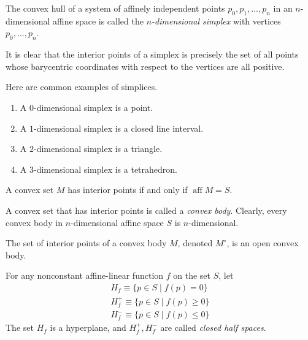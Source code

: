\documentclass{article}
\DeclareMathOperator{\aff}{aff}
\begin{document}
    \begin{definition}
      The convex hull of a system of affinely independent points $p_0, p_1, ..., p_n$ in an $n$-dimensional affine space is called the \textit{$n$-dimensional simplex} with vertices $p_0, ..., p_n$. 
    \end{definition}

    It is clear that the interior points of a simplex is precisely the set of all points whose barycentric coordinates with respect to the vertices are all positive. 

    \begin{example}
      Here are common examples of simplices.
      \begin{enumerate}
        \item A $0$-dimensional simplex is a point. 
        \item A $1$-dimensional simplex is a closed line interval. 
        \item A $2$-dimensional simplex is a triangle. 
        \item A $3$-dimensional simplex is a tetrahedron. 
      \end{enumerate}
    \end{example}

    \begin{proposition}
      A convex set $M$ has interior points if and only if $\aff M = S$. 
    \end{proposition}

    \begin{definition}
      A convex set that has interior points is called a \textit{convex body}. Clearly, every convex body in $n$-dimensional affine space $S$ is $n$-dimensional. 
    \end{definition}

    The set of interior points of a convex body $M$, denoted $M^\circ$, is an open convex body. 

    \begin{definition}
      For any nonconstant affine-linear function $f$ on the set $S$, let
      \begin{align*}
        H_f \equiv \{p \in S \;|\; f(p) = 0\} \\
        H^+_f \equiv \{p \in S \;|\; f(p) \geq 0\} \\
        H^-_f \equiv \{p \in S \;|\; f(p) \leq 0\}
      \end{align*}
      The set $H_f$ is a hyperplane, and $H^+_f, H^-_f$ are called \textit{closed half spaces}. 
    \end{definition}
\end{document}
